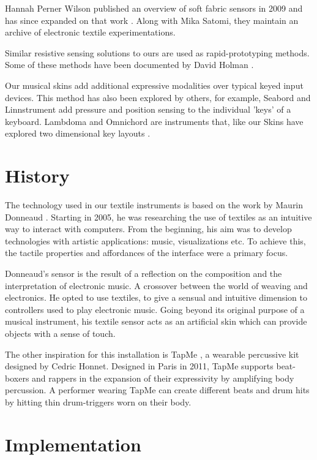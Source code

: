 \documentclass{sigchi-ext}
\begin{document}
Hannah Perner Wilson published an overview of soft fabric sensors in 2009 \cite{perner-wilson:09} and has since expanded on that work \cite{perner-wilson:10}. Along with Mika Satomi, they maintain an archive of electronic textile experimentations\cite{kobakant}.

Similar resistive sensing solutions to ours are used as rapid-prototyping methods. Some of these methods have been documented by David Holman \cite{holman:14, holman:11}.

Our musical skins add additional expressive modalities over typical keyed input devices. This method has also been explored by others, for example, Seabord and Linnstrument \cite{seaboard, linnstrument} add pressure and position sensing to the individual 'keys' of a keyboard. Lambdoma and Omnichord are instruments that, like our Skins have explored two dimensional key layouts \cite{lambdoma, omnichord}.


\section{History}
The technology used in our textile instruments is based on the work by Maurin Donneaud \cite{donneaud}. Starting in 2005, he was researching the use of textiles as an intuitive way to interact with computers. From the beginning, his aim was to develop technologies with artistic applications: music, visualizations etc. To achieve this, the tactile properties and affordances of the interface were a primary focus.

Donneaud's sensor is the result of a reflection on the composition and the interpretation of electronic music. A crossover between the world of weaving and electronics. He opted to use textiles, to give a sensual and intuitive dimension to controllers used to play electronic music. Going beyond its original purpose of a musical instrument, his textile sensor acts as an artificial skin which can provide objects with a sense of touch.

The other inspiration for this installation is TapMe \cite{tapme}, a wearable percussive kit designed by Cedric Honnet. Designed in Paris in 2011, TapMe supports beat-boxers and rappers in the expansion of their expressivity by amplifying body percussion. A performer wearing TapMe can create different beats and drum hits by hitting thin drum-triggers worn on their body.


\section{Implementation}
\end{document}

